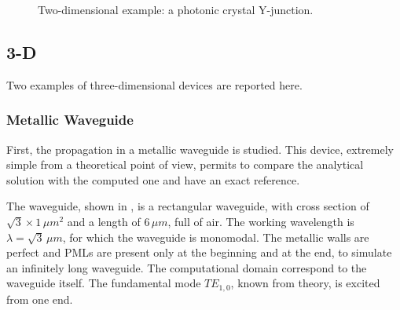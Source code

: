\begin{figure}[htbp]
  \begin{center}
  \end{center}
  \caption{Two-dimensional example: a photonic crystal Y-junction.}
  \label{fig:Yjunct}
\end{figure}

\subsection{3-D} \label{sec:frequency_domain:3D}

Two examples of three-dimensional devices are reported here.

\subsubsection{Metallic Waveguide}

First, the propagation in a metallic waveguide is studied. This
device, extremely simple from a theoretical point of view, permits to
compare the analytical solution with the computed one and have an
exact reference.

The waveguide, shown in , is a
rectangular waveguide, with cross section of $\sqrt{3} \times 1\,\mu
m^2$ and a length of $6\,\mu m$, full of air. The working wavelength
is $\lambda = \sqrt{3}\,\mu m$, for which the waveguide is
monomodal. The metallic walls are perfect and PMLs are present only at
the beginning and at the end, to simulate an infinitely long
waveguide. The computational domain correspond to the waveguide
itself. The fundamental mode $TE_{1,0}$, known from theory, is excited
from one end.

